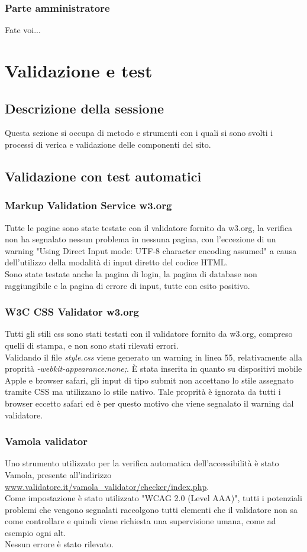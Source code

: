 \documentclass[openany, a4paper, 12pt]{report}
\begin{document}
	\subsection{Parte amministratore}
		Fate voi...

	\chapter{Validazione e test}
		\section{Descrizione della sessione}
			Questa sezione si occupa di metodo e strumenti con i quali si sono svolti i processi di verica e validazione delle componenti del sito.
		\section{Validazione con test automatici}
			\subsection{Markup Validation Service w3.org}
				Tutte le pagine sono state testate con il validatore fornito da w3.org, la verifica non ha segnalato nessun problema in nessuna pagina, con l'eccezione di un warning "Using Direct Input mode: UTF-8 character encoding assumed" a causa dell'utilizzo della modalità di input diretto del codice HTML.\\
				Sono state testate anche la pagina di login, la pagina di database non raggiungibile e la pagina di errore di input, tutte con esito positivo.
			\subsection{W3C CSS Validator w3.org}
				Tutti gli stili css sono stati testati con il validatore fornito da w3.org, compreso quelli di stampa, e non sono stati rilevati errori.\\
				Validando il file \textit{style.css} viene generato un warning in linea 55, relativamente alla proprità \textit{-webkit-appearance:none;}. È stata inserita in quanto su dispositivi mobile Apple e browser safari, gli input di tipo submit non accettano lo stile assegnato tramite CSS ma utilizzano lo stile nativo. Tale proprità è ignorata da tutti i browser eccetto safari ed è per questo motivo che viene segnalato il warning dal validatore.
			\subsection{Vamola validator}
				Uno strumento utilizzato per la verifica automatica dell'accessibilità è stato Vamola, presente all'indirizzo \url{www.validatore.it/vamola_validator/checker/index.php}.\\
				Come impostazione è stato utilizzato "WCAG 2.0 (Level AAA)", tutti i potenziali problemi che vengono segnalati raccolgono tutti elementi che il validatore non sa come controllare e quindi viene richiesta una supervisione umana, come ad esempio ogni alt.\\
				Nessun errore è stato rilevato.
\end{document}

